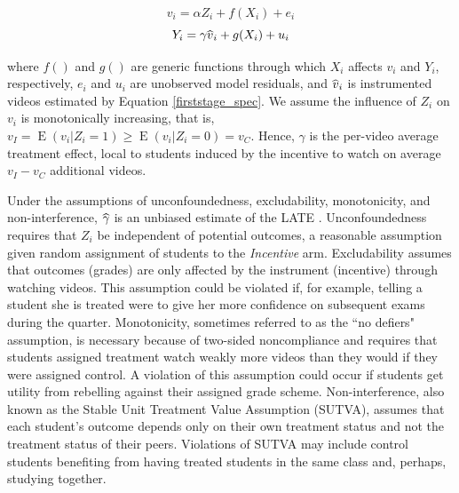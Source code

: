 \documentclass[12pt]{article}
\newcommand\wh[1]{\hstretch{2}{\hat{\hstretch{.5}{#1}}}}
\begin{document}
\begin{equation} \label{firststage_spec}
	v_i = \alpha Z_i + f(X_i) + e_i
\end{equation}
\begin{equation} \label{secondstage_spec}
	Y_i = \gamma \wh{v}_i + g(X_i) + u_i
\end{equation}

where $f()$ and $g()$ are generic functions through which $X_i$ affects $v_i$ and $Y_i$, respectively, $e_i$ and $u_i$ are unobserved model residuals, and $\wh{v}_i$ is instrumented videos estimated by Equation \ref{firststage_spec}. We assume the influence of $Z_i$ on $v_i$ is monotonically increasing, that is, $v_I = \operatorname{E}(v_i|Z_i=1) \geq \operatorname{E}(v_i|Z_i=0) = v_C$. Hence, $\gamma$ is the per-video average treatment effect, local to students induced by the incentive to watch on average $v_I - v_C$ additional videos.

Under the assumptions of unconfoundedness, excludability, monotonicity, and non-interference, $\wh{\gamma}$ is an unbiased estimate of the LATE \parencite{ai1995}. Unconfoundedness requires that $Z_i$ be independent of potential outcomes, a reasonable assumption given random assignment of students to the \textit{Incentive} arm. Excludability assumes that outcomes (grades) are only affected by the instrument (incentive) through watching videos. This assumption could be violated if, for example, telling a student she is treated were to give her more confidence on subsequent exams during the quarter. Monotonicity, sometimes referred to as the ``no defiers" assumption, is necessary because of two-sided noncompliance and requires that students assigned treatment watch weakly more videos than they would if they were assigned control. A violation of this assumption could occur if students get utility from rebelling against their assigned grade scheme. Non-interference, also known as the Stable Unit Treatment Value Assumption (SUTVA), assumes that each student's outcome depends only on their own treatment status and not the treatment status of their peers. Violations of SUTVA may include control students benefiting from having treated students in the same class and, perhaps, studying together.
\end{document}
